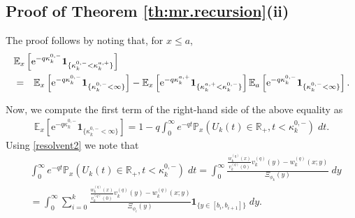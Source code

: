 \documentclass[12pt,reqno]{amsart}
\newcommand{\red}{\textcolor[rgb]{1.00,0.00,0.00}}
\theoremstyle{definition}
\theoremstyle{remark}
\newcommand{\e}{\mathbb{E}}
\newcommand{\ind}{\mathbf{1}}
\begin{document}
\subsection{Proof of Theorem \ref{th:mr.recursion}(ii)}
The proof follows by noting that, for $x \leq a$,
\begin{eqnarray*}
\lefteqn{\e_x \left[ \mathrm{e}^{-q \kappa_k^{0,-}} \ind_{\{\kappa_k^{0,-}<\kappa_k^{a,+}\}} \right]}\\&=&
\e_x \left[ \mathrm{e}^{-q \kappa_k^{0,-}} \ind_{\{\kappa_k^{0,-}<\infty\}} \right]-
\e_x \left[ \mathrm{e}^{-q \kappa_k^{a,+}} \ind_{\{\kappa_k^{a,+}<\kappa_k^{0,-}\}} \right]\e_a \left[ \mathrm{e}^{-q \kappa_k^{0,-}} 
\ind_{\{\kappa_k^{0,-}<\infty\}} \right].
\end{eqnarray*}


Now, we compute the first term of the right-hand side of the above equality as
\begin{align*}
\e_x \left[ \mathrm{e}^{-q \kappa_k^{0,-}} \ind_{\{\kappa_k^{0,-}<\infty\}} \right]=
1-q\int_0^{\infty}e^{-qt}\mathbb{P}_x(U_k(t)\in \mathbb{R}_+,t<\kappa_k^{0,-})\;dt.
\end{align*}
Using \eqref{resolvent2} we note that
\begin{align*}
&\int_0^{\infty}e^{-qt}\mathbb{P}_x(U_k(t)\in \mathbb{R}_+,t<\kappa_k^{0,-})\;dt
=\int_0^{\infty}
\frac{\frac{w_k^{(q)}(x)}{v_k^{(q)}(0)}v_k^{(q)}(y)-w_k^{(q)}(x;y)}
{\Xi_{\phi_k}(y)}  \;dy\\
&=\int_0^{\infty}\sum_{i=0}^{k}
\frac{\frac{w_k^{(q)}(x)}{v_k^{(q)}(0)}v_k^{(q)}(y)-w_k^{(q)}(x;y)}
{\Xi_{\phi_i}(y)} \ind_{\{y\in[b_i,b_{i+1}]\}} \;dy.
\end{align*}


\end{document}
